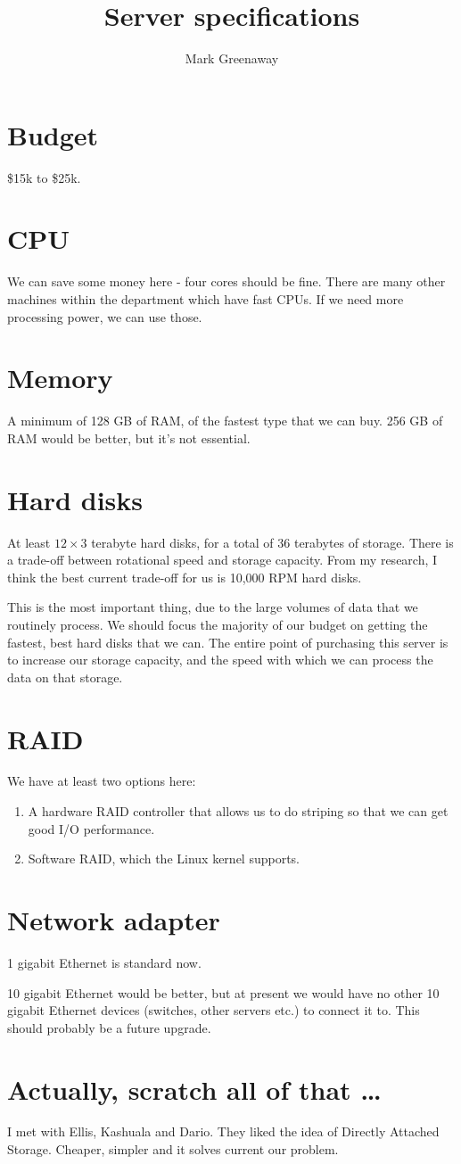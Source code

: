 \documentclass{amsart}
\author{Mark Greenaway}
\title{Server specifications}
\begin{document}
\section{Budget}
\$15k to \$25k.

\section{CPU}
We can save some money here - four cores should be fine. There
are many other machines within the department which have fast
CPUs. If we need more processing power, we can use those.

\section{Memory}
A minimum of 128 GB of RAM, of the fastest type that we can buy.
256 GB of RAM would be better, but it's not essential.

\section{Hard disks}
At least $12 \times 3$ terabyte hard disks, for a total of 36 terabytes of storage.
There is a trade-off between rotational speed and storage capacity. From my
research, I think the best current trade-off for us is 10,000 RPM hard disks.

This is the most important thing, due to the large volumes of data that we
routinely process. We should focus the majority of our budget on
getting the fastest, best hard disks that we can. The entire point of
purchasing this server is to increase our storage capacity, and the
speed with which we can process the data on that storage.

\section{RAID}
We have at least two options here:

\begin{enumerate}
\item A hardware RAID controller that allows us to do striping so that
we can get good I/O performance.
\item Software RAID, which the Linux kernel supports.
\end{enumerate}

\section{Network adapter}
1 gigabit Ethernet is standard now.

10 gigabit Ethernet would be better, but at present we would have no
other 10 gigabit Ethernet devices (switches, other servers etc.) to
connect it to. This should probably be a future upgrade.

\section{Actually, scratch all of that \ldots}
I met with Ellis, Kashuala and Dario. They liked the idea of Directly Attached
Storage. Cheaper, simpler and it solves current our problem.
\end{document}
